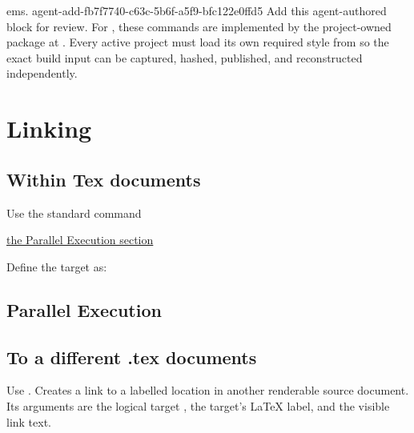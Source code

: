 
\label{doc:manual-style}
ems. 
\agentProposedEdit
  {agent-add-fb7f7740-c63c-5b6f-a5f9-bfc122e0ffd5}
  {Add this agent-authored block for review.}
  {}
  {For , these commands are implemented by the project-owned package at .
Every active  project must load its own required style from  so the exact build input can be captured, hashed, published, and reconstructed independently.}

\section*{Linking}\label{sec:manual-style-tex-link}
\subsection*{Within Tex documents}
Use the standard  command

\begin{DocCode}
\hyperref[sec:parallel-execution]{the Parallel Execution section}
\end{DocCode}

Define the target as:

\begin{DocCode}
\subsection*{Parallel Execution}
\label{sec:parallel-execution}
\end{DocCode}

\subsection*{To a different .tex documents}
Use \code{\TexLink}.
Creates a link to a labelled location in another renderable source document.
Its arguments are the logical target , the target's LaTeX label, and the visible link text.

